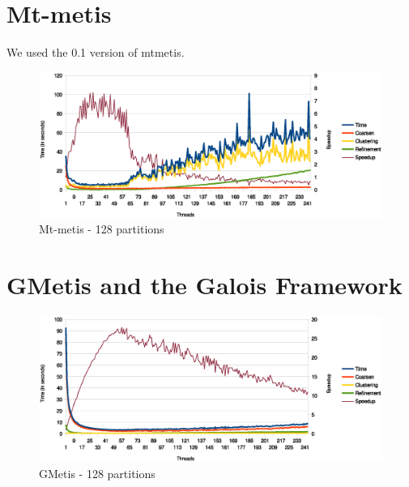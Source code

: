 \documentclass[abstract=on,9pt,twocolumn]{scrartcl}
\begin{document}
\section{Mt-metis}
\label{sec:mt-metis}

We used the 0.1 version of mtmetis.

\begin{center}
\begin{figure}[htb]
    \includegraphics[width=\columnwidth]{img/mtmetis128.eps}
    \caption{Mt-metis - 128 partitions}
    \label{img:mtmetis128}
\end{figure}
\end{center}



\section{GMetis and the Galois Framework} %

\begin{center}
\begin{figure}[htb]
    \includegraphics[width=\columnwidth]{img/gmetis128.eps}
    \caption{GMetis - 128 partitions}
    \label{gmetis128}
\end{figure}
\end{center}
\end{document}
